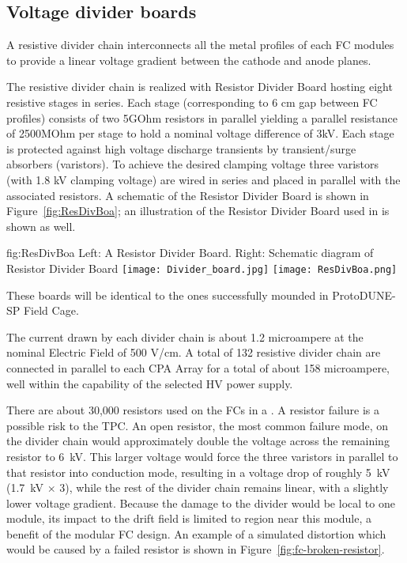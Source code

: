 \subsection{Voltage divider boards}
A resistive divider chain interconnects all the metal profiles of each FC modules to provide a linear voltage gradient between the cathode and anode planes.

The resistive divider chain is realized with Resistor Divider Board hosting eight resistive stages in series. Each stage (corresponding to 6 cm gap between FC profiles)  consists of two 5GOhm resistors in parallel yielding a parallel resistance of 2500MOhm per stage to hold a nominal voltage difference of 3kV. Each stage is protected against high voltage discharge transients by transient/surge absorbers (varistors). To achieve the desired clamping voltage three varistors (with 1.8 kV clamping voltage) are wired in series and placed in parallel with the associated resistors. A schematic of the Resistor Divider Board is shown in Figure~\ref{fig:ResDivBoa}; an illustration of the Resistor Divider Board used in  is shown as well.

\begin{dunefigure}{fig:ResDivBoa}
  {Left: A  Resistor Divider Board. Right: Schematic diagram of Resistor Divider Board}
  \texttt{[image: Divider\_board.jpg]}
  \texttt{[image: ResDivBoa.png]}
\end{dunefigure}

These boards will be identical to the ones successfully mounded in ProtoDUNE-SP Field Cage. 

The current drawn by each divider chain is about 1.2 microampere at the nominal Electric Field of 500 V/cm. A total of 132 resistive divider chain are connected in parallel to each CPA Array for a total of about 158 microampere, well within the capability of the selected HV power supply.

There are about 30,000 resistors used on the FCs in a . A resistor failure is a possible risk to the TPC.  
An open resistor, the most common failure mode, on the divider chain would approximately double the voltage across the remaining resistor to \SI{6}{kV}.  This larger voltage would force the three varistors in parallel to that resistor into conduction mode, resulting in a voltage drop of roughly \SI{5}{kV} (\SI{1.7}{kV} $\times$ \num{3}), while the rest of the divider chain remains linear, with a slightly lower voltage gradient. 
Because the damage to the divider would be local to one module, its impact to the  drift field is limited to region near this module, a benefit of the modular FC design.
An example of a simulated \efield{} distortion which would be caused by a failed resistor is shown in Figure~\ref{fig:fc-broken-resistor}. 

